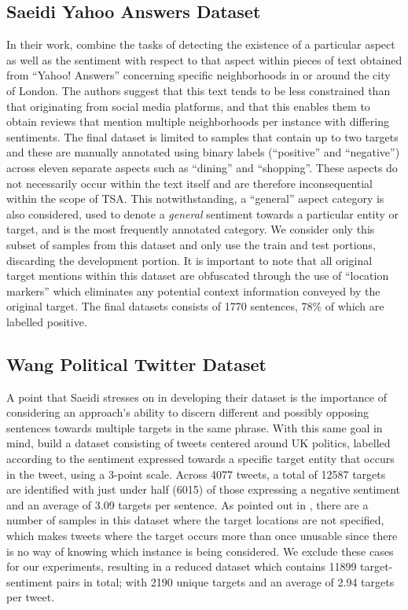 \documentclass[../../fyp.tex]{subfiles}
\begin{document}
\subsection{Saeidi Yahoo Answers Dataset} \label{ds:saeidi}
In their work, \citet{saeidi2016} combine the tasks of detecting the existence of a particular aspect as well as the sentiment with respect to that aspect within pieces of text obtained from \enquote{Yahoo! Answers} concerning specific neighborhoods in or around the city of London. The authors suggest that this text tends to be less constrained than that originating from social media platforms, and that this enables them to obtain reviews that mention multiple neighborhoods per instance with differing sentiments. The final dataset is limited to samples that contain up to two targets and these are manually annotated using binary labels (\enquote{positive} and \enquote{negative}) across eleven separate aspects such as \enquote{dining} and \enquote{shopping}. These aspects do not necessarily occur within the text itself and are therefore inconsequential within the scope of TSA. This notwithstanding, a \enquote{general} aspect category is also considered, used to denote a \textit{general} sentiment towards a particular entity or target, and is the most frequently annotated category. We consider only this subset of samples from this dataset and only use the train and test portions, discarding the development portion. It is important to note that all original target mentions within this dataset are obfuscated through the use of \enquote{location markers} which eliminates any potential context information conveyed by the original target. The final datasets consists of 1770 sentences, 78\% of which are labelled positive. 

\subsection{Wang Political Twitter Dataset} \label{ds:wang} 
A point that Saeidi \cite{saeidi2016} stresses on in developing their dataset is the importance of considering an approach's ability to discern different and possibly opposing sentences towards multiple targets in the same phrase. With this same goal in mind, \citet{wang2017} build a dataset consisting of tweets centered around UK politics, labelled according to the sentiment expressed towards a specific target entity that occurs in the tweet, using a 3-point scale. Across 4077 tweets, a total of 12587 targets are identified with just under half (6015) of those expressing a negative sentiment and an average of 3.09 targets per sentence. As pointed out in \citet{moore2018}, there are a number of samples in this dataset where the target locations are not specified, which makes tweets where the target occurs more than once unusable since there is no way of knowing which instance is being considered. We exclude these cases for our experiments, resulting in a reduced dataset which contains 11899 target-sentiment pairs in total; with 2190 unique targets and an average of 2.94 targets per tweet.
\end{document}
